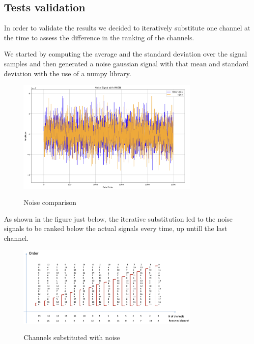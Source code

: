 \documentclass{Configuration_Files/PoliMi3i_thesis}
\begin{document}
\subsection*{Tests validation}

In order to validate the results we decided to iteratively substitute one channel at the time to assess the difference in the ranking of the channels.

We started by computing the average and the standard deviation over the signal samples and then generated a noise gaussian signal with that mean and standard deviation with the use of a numpy library.

\begin{figure}[H]
    \centering
    \includegraphics[width=0.8\textwidth]{Results Matteo/Screenshot 2024-08-19 at 08.02.37.png}
    \label{results_1}
    \caption{Noise comparison}
\end{figure}

As shown in the figure just below, the iterative substitution led to the noise signals to be ranked below the actual signals every time, up untill the last channel.

\begin{figure}[H]
    \centering
    \includegraphics[width=0.8\textwidth]{Results Matteo/Screenshot 2024-08-19 at 08.09.29.png}
    \label{results_2}
    \caption{Channels substituted with noise}
\end{figure}
\end{document}
